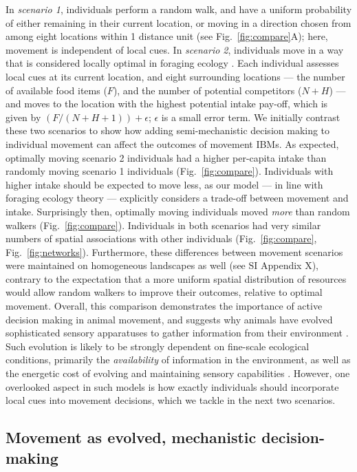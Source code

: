 In \textit{scenario 1}, individuals perform a random walk, and have a uniform probability of either remaining in their current location, or moving in a direction chosen from among eight locations within 1 distance unit (see Fig.~\ref{fig:compare}A); here, movement is independent of local cues.
In \textit{scenario 2}, individuals move in a way that is considered locally optimal in foraging ecology \citep{stephens2019,scherer2020}.
Each individual assesses local cues at its current location, and eight surrounding locations --- the number of available food items ($F$), and the number of potential competitors ($N + H$) --- and moves to the location with the highest potential intake pay-off, which is given by $(F / (N + H + 1)) + \epsilon$; $\epsilon$ is a small error term.
We initially contrast these two scenarios to show how adding semi-mechanistic decision making to individual movement can affect the outcomes of movement IBMs.
As expected, optimally moving scenario 2 individuals had a higher per-capita intake than randomly moving scenario 1 individuals (Fig.~\ref{fig:compare}).
Individuals with higher intake should be expected to move less, as our model --- in line with foraging ecology theory \citep{charnov1976} --- explicitly considers a trade-off between movement and intake.
Surprisingly then, optimally moving individuals moved \textit{more} than random walkers (Fig.~\ref{fig:compare}).
Individuals in both scenarios had very similar numbers of spatial associations with other individuals (Fig.~\ref{fig:compare}, Fig.~\ref{fig:networks}).
Furthermore, these differences between movement scenarios were maintained on homogeneous landscapes as well (see SI Appendix X), contrary to the expectation that a more uniform spatial distribution of resources would allow random walkers to improve their outcomes, relative to optimal movement.
Overall, this comparison demonstrates the importance of active decision making in animal movement, and suggests why animals have evolved sophisticated sensory apparatuses to gather information from their environment \citep{avgar2013,berger2022,mann2021,swain2021}.
Such evolution is likely to be strongly dependent on fine-scale ecological conditions, primarily the \textit{availability} of information in the environment, as well as the energetic cost of evolving and maintaining sensory capabilities \citep{swain2021}.
However, one overlooked aspect in such models is how exactly individuals should incorporate local cues into movement decisions, which we tackle in the next two scenarios.

\subsection*{Movement as evolved, mechanistic decision-making}

